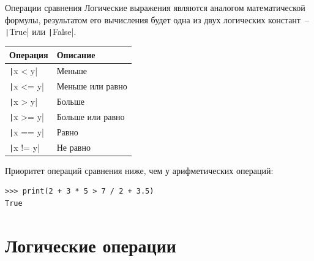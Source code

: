 \documentclass[aspectratio=169, mathserif]{beamer}	%
\begin{document}
\begin{frame}[fragile]{Операции сравнения}
\scriptsize
Логические выражения являются аналогом математической формулы, результатом его вычисления будет одна из двух логических констант~-- \texttt|True| или \texttt|False|.

\begin{table}[h!]
\centering
\begin{tabular}{|p{}|p{}|}
	\hline
	\textbf{Операция} & \textbf{Описание} \\
	\hline
	\texttt|x < y| & Меньше \\
	\texttt|x <= y| & Меньше или равно \\
	\texttt|x > y| & Больше \\
	\texttt|x >= y| & Больше или равно \\
	\texttt|x == y| & Равно \\
	\texttt|x != y| & Не равно \\
	\hline
\end{tabular}	
\end{table}

{\color{tpugreen}\textbullet} Приоритет операций сравнения ниже, чем у арифметических операций:

\begin{verbatim}
>>> print(2 + 3 * 5 > 7 / 2 + 3.5)
True
\end{verbatim}
\vfill
\end{frame}


%
%
%
%


\section{Логические операции}
\sectionframe
\end{document}
